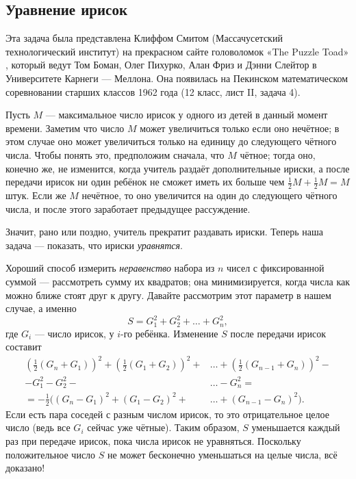 \subsection*{Уравнение ирисок}

Эта задача была представлена Клиффом Смитом (Массачусетский технологический институт) на прекрасном сайте головоломок «The Puzzle Toad» \cite{bohman-pikhurko-frieze-sleator}, который ведут Том Боман, Олег Пихурко, Алан Фриз и Дэнни Слейтор в Университете Карнеги — Меллона.
Она появилась на Пекинском математическом соревновании старших классов 1962 года (12 класс, лист II, задача 4).

Пусть $M$ --- максимальное число ирисок у одного из детей в данный момент времени.
Заметим что число $M$ может увеличиться только если оно нечётное;
в этом случае оно может увеличиться только на единицу до следующего чётного числа.
Чтобы понять это, предположим сначала, что $M$ чётное; тогда оно, конечно же, не изменится, когда учитель раздаёт дополнительные ириски, а после передачи ирисок ни один ребёнок не сможет иметь их больше чем $\tfrac12 M + \tfrac12 M = M$ штук.
Если же $M$ нечётное, то оно увеличится на один до следующего чётного числа, и после этого заработает предыдущее рассуждение.

Значит, рано или поздно, учитель прекратит раздавать ириски.
Теперь наша задача --- показать, что ириски \emph{уравнятся}.

Хороший способ измерить \emph{неравенство} набора из $n$ чисел с фиксированной суммой --- рассмотреть сумму их квадратов; она минимизируется, когда числа как можно ближе стоят друг к другу.
Давайте рассмотрим этот параметр в нашем случае, а именно 
\[S = G^2_1 + G^2_2 + \dots + G^2_n,\]
где $G_i$ --- число ирисок, у $i$-го ребёнка.
Изменение $S$ после передачи ирисок составит
\begin{align*}
\left(\tfrac{1}{2}(G_n+G_1)\right)^2+\left(\tfrac{1}{2}(G_1+G_2)\right)^2+&\dots+\left(\tfrac{1}{2}(G_{n-1}+G_n)\right)^2-
\\
-G_1^2-G_2^2-&\dots-G_n^2=
\\
=-\tfrac12\bigl((G_n-G_1)^2+(G_1-G_2)^2+&\dots+(G_{n-1}-G_n)^2\bigr).
\end{align*}
Если есть пара соседей с разным числом ирисок, то это отрицательное целое число (ведь все $G_i$ сейчас уже чётные).
Таким образом, $S$ уменьшается каждый раз при передаче ирисок, пока числа ирисок не уравняться.
Поскольку положительное число $S$ не может бесконечно уменьшаться на целые числа, всё доказано!

